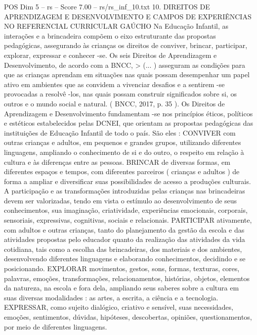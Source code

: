 \begin{textsample}{POS Dim 5 – rs – Score 7.00 – rs/rs\_inf\_10.txt}  \label{ex:f5_pos_261}
10.
DIREITOS DE APRENDIZAGEM E DESENVOLVIMENTO E CAMPOS DE EXPERIÊNCIAS NO REFERENCIAL CURRICULAR GAÚCHO Na Educação Infantil, as interações e a brincadeira compõem o eixo estruturante das propostas pedagógicas, assegurando às crianças os direitos de conviver, brincar, participar, explorar, expressar e conhecer -se.
Os seis Direitos de Aprendizagem e Desenvolvimento, de acordo com a BNCC, > (... ) asseguram as condições para que as crianças aprendam em situações nas quais possam desempenhar um papel ativo em ambientes que as convidem a vivenciar desafios e a sentirem -se provocadas a resolvê -los, nas quais possam construir significados sobre si, os outros e o mundo social e natural. ( BNCC, 2017, p. 35 ).
Os Direitos de Aprendizagem e Desenvolvimento fundamentam -se nos princípios éticos, políticos e estéticos estabelecidos pelas DCNEI, que orientam as propostas pedagógicas das instituições de Educação Infantil de todo o país.
São eles : CONVIVER com outras crianças e adultos, em pequenos e grandes grupos, utilizando diferentes linguagens, ampliando o conhecimento de si e do outro, o respeito em relação à cultura e às diferenças entre as pessoas.
BRINCAR de diversas formas, em diferentes espaços e tempos, com diferentes parceiros ( crianças e adultos ) de forma a ampliar e diversificar suas possibilidades de acesso a produções culturais.
A participação e as transformações introduzidas pelas crianças nas brincadeiras devem ser valorizadas, tendo em vista o estímulo ao desenvolvimento de seus conhecimentos, sua imaginação, criatividade, experiências emocionais, corporais, sensoriais, expressivas, cognitivas, sociais e relacionais.
PARTICIPAR ativamente, com adultos e outras crianças, tanto do planejamento da gestão da escola e das atividades propostas pelo educador quanto da realização das atividades da vida cotidiana, tais como a escolha das brincadeiras, dos materiais e dos ambientes, desenvolvendo diferentes linguagens e elaborando conhecimentos, decidindo e se posicionando.
EXPLORAR movimentos, gestos, sons, formas, texturas, cores, palavras, emoções, transformações, relacionamentos, histórias, objetos, elementos da natureza, na escola e fora dela, ampliando seus saberes sobre a cultura em suas diversas modalidades : as artes, a escrita, a ciência e a tecnologia.
EXPRESSAR, como sujeito dialógico, criativo e sensível, suas necessidades, emoções, sentimentos, dúvidas, hipóteses, descobertas, opiniões, questionamentos, por meio de diferentes linguagens.

\end{textsample}
